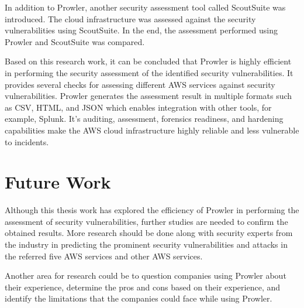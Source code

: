 \par In addition to Prowler, another security assessment
tool called ScoutSuite was introduced.
The cloud infrastructure was assessed against the security
vulnerabilities using ScoutSuite.
In the end, the assessment performed using Prowler and
ScoutSuite was compared.

\par Based on this research work, it can be concluded that Prowler is highly efficient in performing the security assessment of the identified security vulnerabilities.
It provides several checks for assessing different AWS services against security vulnerabilities.
Prowler generates the assessment result in multiple formats such as CSV, HTML, and JSON which enables integration with other tools, for example, Splunk.
It’s auditing, assessment, forensics readiness, and hardening capabilities make the AWS cloud infrastructure highly reliable and less vulnerable to incidents.


\section{Future Work}

\par Although this thesis work has explored the efficiency of Prowler in performing the assessment of security vulnerabilities, further studies are needed to confirm the obtained results.
More research should be done along with security experts from the industry in predicting the prominent security vulnerabilities and attacks in the referred five AWS services and other AWS services.


\par Another area for research could be to question companies using Prowler about their experience, determine
the pros and cons based on their experience, and identify
the limitations that the companies could face while using
Prowler.